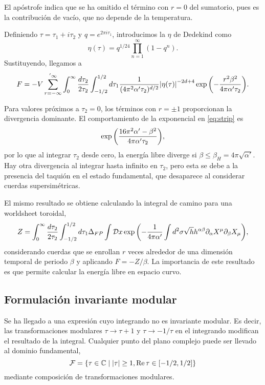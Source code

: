 El apóstrofe indica que se ha omitido el término con $r=0$ del sumatorio, pues es la contribución
de vacío, que no depende de la temperatura.

Definiendo $\tau=\tau_1+i\tau_2$ y $q=e^{2\pi i\tau_1}$, introducimos la $\eta$ de 
Dedekind como
\begin{equation}
  \eta(\tau)=q^{1/24}\prod_{n=1}^{\infty} (1-q^n).
\end{equation}
Sustituyendo, llegamos a 
\begin{equation}
  F=-V \sum_{r=-\infty}^{'\infty} \int_0^\infty\frac{d\tau_2}{2\tau_2} \int_{-1/2}^{1/2} d\tau_1  \frac{1}{(4\pi^2\alpha'\tau_2)^{d/2}}
  \abs{\eta(\tau)}^{-2d+4}\exp\qty(-\frac{r^2\beta^2}{4\pi\alpha'\tau_2}).
  \label{eq:strip}
\end{equation}

Para valores próximos a $\tau_2=0$, los términos con $r=\pm 1$ proporcionan la divergencia 
dominante.
El comportamiento de la exponencial en \ref{eq:strip} es
\begin{equation}
  \exp\qty(\frac{16\pi^2 \alpha' -\beta^2}{4\pi\alpha'\tau_2}),
\end{equation}
por lo que al integrar $\tau_2$ desde cero, la energía libre diverge si $\beta\leq \beta_H=4\pi\sqrt{\alpha'}$.
Hay otra divergencia al integrar hasta infinito en $\tau_2$, pero esta se debe a la presencia 
del taquión en el estado fundamental, que desaparece al considerar cuerdas supersimétricas.

El mismo resultado se obtiene calculando la integral de camino para una worldsheet toroidal,
\begin{equation}
  Z= \int_0^\infty\frac{d\tau_2}{2\tau_2} \int_{-1/2}^{1/2} d\tau_1 \Delta_{FP} \int \mathcal Dx
  \exp\qty(-\frac{1}{4\pi\alpha'}\int d^2\sigma \sqrt h h^{\alpha\beta}\partial_\alpha X^\mu \partial_\beta X_\mu),
\end{equation}
considerando cuerdas que se enrollan $r$ veces alrededor de una dimensión temporal de periodo $\beta$
y aplicando $F=-Z/\beta$.
La importancia de este resultado es que permite calcular la energía libre en espacio curvo.

\subsection{Formulación invariante modular}
\label{sec:taq}
Se ha llegado a una expresión cuyo integrando no es invariante modular. Es decir, las
transformaciones modulares $\tau\to\tau+1$ y $\tau\to-1/\tau$ en el integrando modifican el resultado
de la integral.
Cualquier punto del plano complejo puede ser llevado al dominio fundamental,
\begin{equation}
  \mathcal F = \qty{ \tau \in \mathbb{C} \mid \abs{\tau} \geq 1, \Re\tau \in [-1/2,1/2]}
\end{equation}
mediante composición de transformaciones modulares.

